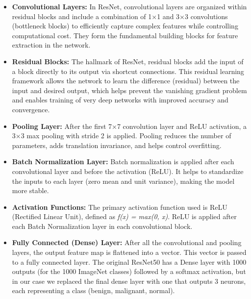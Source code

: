 \begin{itemize}
    \item \textbf{Convolutional Layers:} In ResNet, convolutional layers are organized within 
    residual blocks and include a combination of 1×1 and 3×3 convolutions (bottleneck blocks) to 
    efficiently capture complex features while controlling computational cost. They form the 
    fundamental building blocks for feature extraction in the network.

    \item \textbf{Residual Blocks:} The hallmark of ResNet, residual blocks add the input of a block 
    directly to its output via shortcut connections. This residual learning framework allows the 
    network to learn the difference (residual) between the input and desired output, which helps 
    prevent the vanishing gradient problem and enables training of very deep networks with improved 
    accuracy and convergence.
    
    \item \textbf{Pooling Layer:} After the first 7×7 convolution layer and ReLU activation, a 3×3 
    max pooling with stride 2 is applied. Pooling reduces the number of parameters, adds translation 
    invariance, and helps control overfitting.

    \item \textbf{Batch Normalization Layer:} Batch normalization is applied after each 
    convolutional layer and before the activation (ReLU). It helps to standardize the inputs to each 
    layer (zero mean and unit variance), making the model more stable.

    \item \textbf{Activation Functions:} The primary activation function used is ReLU (Rectified 
    Linear Unit), defined as \textit{f(x) = max(0, x)}. ReLU is applied after each Batch 
    Normalization layer in each convolutional block.

    \item \textbf{Fully Connected (Dense) Layer:} After all the convolutional and pooling layers, 
    the output feature map is flattened into a vector. This vector is passed to a fully connected 
    layer. The original ResNet50 has a Dense layer with 1000 outputs (for the 1000 ImageNet classes) 
    followed by a softmax activation, but in our case we replaced the final dense layer with one 
    that outputs 3 neurons, each representing a class (benign, malignant, normal).
\end{itemize}
